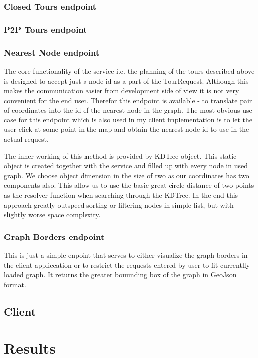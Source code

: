 \documentclass{ctuthesis}
\begin{document}
\subsection{Closed Tours endpoint}

\subsection{P2P Tours endpoint}

\subsection{Nearest Node endpoint}
The core functionality of the service i.e. the planning of the tours described above is designed to accept just a node id as a part of the TourRequest. Although this makes the communication easier from development side of view it is not very convenient for the end user. Therefor this endpoint is available - to translate pair of coordinates into the id of the nearest node in the graph. The most obvious use case for this endpoint which is also used in my client implementation is to let the user click at some point in the map and obtain the nearest node id to use in the actual request. \par
The inner working of this method is provided by KDTree object. This static object is created together with the service and filled up with every node in used graph. We choose object dimension in the size of two as our coordinates has two components also. This allow us to use the basic great circle distance of two points as the resolver function when searching through the KDTree. In the end this approach greatly outspeed sorting or filtering nodes in simple list, but with slightly worse space complexity.

\subsection{Graph Borders endpoint}
This is just a simple enpoint that serves to either visualize the graph borders in the client appliccation or to restrict the requests entered by user to fit currentlly loaded graph.  It returns the greater bouunding box of the graph in GeoJson format. 


\section{Client}

\chapter{Results}
\end{document}
